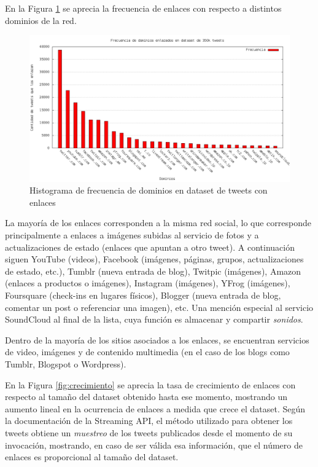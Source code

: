 \documentclass[11pt,letterpaper]{article}
\begin{document}
   En la Figura \ref{fig:dominios} se aprecia la frecuencia de enlaces con
   respecto a distintos dominios de la red.

   \begin{figure}[htb]
\centering
\includegraphics[width=15cm]{./img/dominios.png}
\caption{\label{fig:dominios}Histograma de frecuencia de dominios en dataset de tweets con enlaces}
\end{figure}
   
   La mayoría de los enlaces corresponden a la misma red social, lo
   que corresponde principalmente a enlaces a imágenes subidas al
   servicio de fotos y a actualizaciones de estado (enlaces que apuntan a otro
   tweet). A continuación siguen YouTube (videos), Facebook (imágenes,
   páginas, grupos, actualizaciones de estado, etc.), Tumblr
   (nueva entrada de blog), Twitpic (imágenes), Amazon (enlaces a
   productos o imágenes), Instagram (imágenes), YFrog (imágenes),
   Foursquare (check-ins en lugares físicos), Blogger (nueva entrada
   de blog, comentar un post o referenciar una imagen), etc. Una
   mención especial al servicio SoundCloud al final de la lista, cuya
   función es almacenar y compartir \emph{sonidos}.

   Dentro de la mayoría de los sitios asociados a los enlaces, se
   encuentran servicios de video, imágenes y de contenido multimedia
   (en el caso de los blogs como Tumblr, Blogspot o Wordpress).

   En la Figura \ref{fig:crecimiento} se aprecia la tasa de crecimiento de
   enlaces con respecto al tamaño del dataset obtenido hasta ese
   momento, mostrando un aumento lineal en la ocurrencia de enlaces a
   medida que crece el dataset. Según la documentación de la Streaming
   API, el método utilizado para obtener los tweets obtiene un
   \emph{muestreo} de los tweets publicados desde el momento de su
   invocación, mostrando, en caso de ser válida esa información, que
   el número de enlaces es proporcional al tamaño del dataset.
\end{document}
